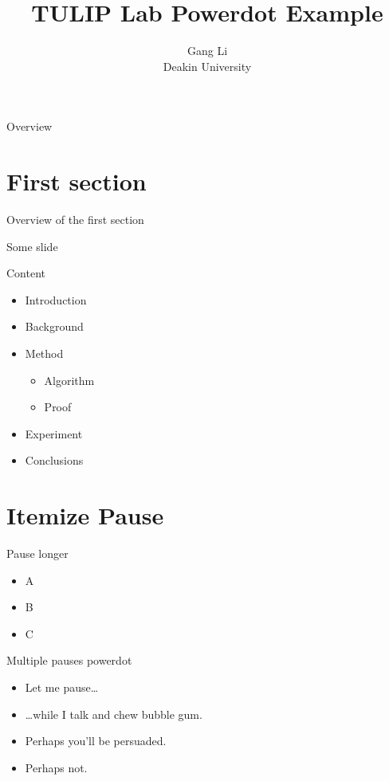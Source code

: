 \documentclass[
 size=12pt,
 paper=smartboard, %
 mode=present, %
 display=slides, %
style=tulip,
pauseslide,
fleqn,leqno,clock]{powerdot}
\title{TULIP Lab Powerdot Example}
\author{Gang Li  
\\
Deakin University 
}
\begin{document}
\maketitle 

\begin{slide}[toc=,bm=]{Overview}
\tableofcontents[content=sections]
\end{slide}
\section{First section}
\begin{slide}[toc=,bm=]{Overview of the first section}
\tableofcontents[content=currentsection,type=1]
\end{slide}
\begin{slide}{Some slide}
\end{slide}

\begin{slide}{Content}
  \begin{itemize}
    \item Introduction\pause
    \item Background
    \item Method \pause
      \begin{itemize}
      \item Algorithm
      \item Proof
      \end{itemize}
    \item Experiment
    \item Conclusions
  \end{itemize}
\end{slide}


\section{Itemize Pause}


\begin{slide}{Pause longer}
\begin{itemize}
\item A \pause
\item B \pause[2]
\item C
\end{itemize}
\end{slide}


\begin{slide}{Multiple pauses}
power\pause dot \pause
\begin{itemize}
\item Let me pause\ldots \pause
\item \ldots while I talk \pause and chew bubble gum. \pause
\item Perhaps you’ll be persuaded.
\item Perhaps not.
\end{itemize}
\end{slide}
\end{document}

